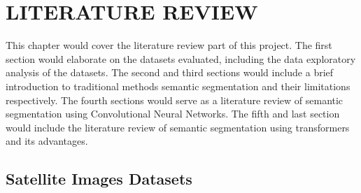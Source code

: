 \chapter{LITERATURE REVIEW}
\label{chapter: 2}

This chapter would cover the literature review part of this project. The first section would elaborate on the datasets evaluated, including the data exploratory analysis of the datasets.  The second and third sections would include a brief introduction to traditional methods semantic segmentation and their limitations respectively. The fourth sections would serve as a literature review of semantic segmentation using Convolutional Neural Networks. The fifth and last section would include the literature review of semantic segmentation using transformers and its advantages.

\section{Satellite Images Datasets}

